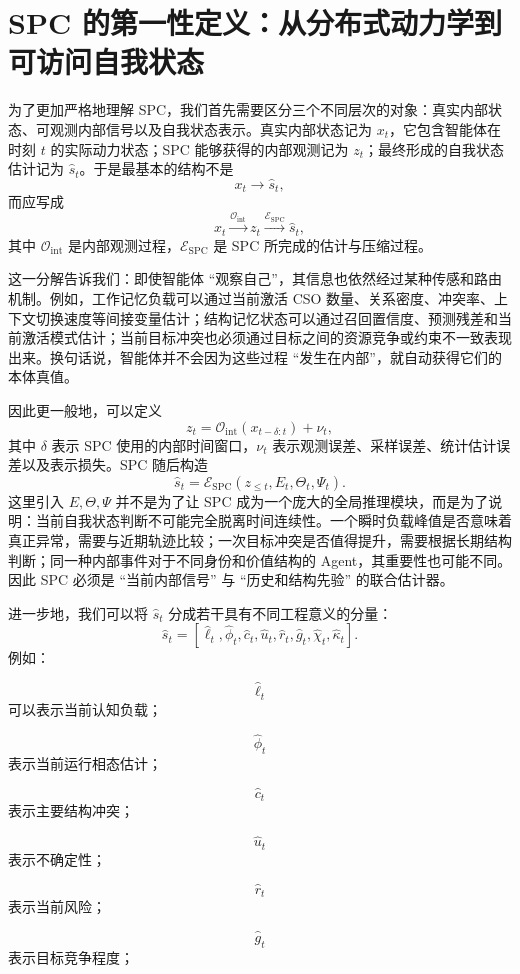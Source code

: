 \section{SPC 的第一性定义：从分布式动力学到可访问自我状态}

为了更加严格地理解 SPC，我们首先需要区分三个不同层次的对象：真实内部状态、可观测内部信号以及自我状态表示。真实内部状态记为 $x_t$，它包含智能体在时刻 $t$ 的实际动力状态；SPC 能够获得的内部观测记为 $z_t$；最终形成的自我状态估计记为 $\hat{s}_t$。于是最基本的结构不是
\[
x_t\rightarrow \hat{s}_t,
\]
而应写成
\[
x_t
\xrightarrow{\mathcal O_{\mathrm{int}}}
z_t
\xrightarrow{\mathcal E_{\mathrm{SPC}}}
\hat{s}_t ,
\]
其中 $\mathcal O_{\mathrm{int}}$ 是内部观测过程，$\mathcal E_{\mathrm{SPC}}$ 是 SPC 所完成的估计与压缩过程。

这一分解告诉我们：即使智能体 ``观察自己''，其信息也依然经过某种传感和路由机制。例如，工作记忆负载可以通过当前激活 CSO 数量、关系密度、冲突率、上下文切换速度等间接变量估计；结构记忆状态可以通过召回置信度、预测残差和当前激活模式估计；当前目标冲突也必须通过目标之间的资源竞争或约束不一致表现出来。换句话说，智能体并不会因为这些过程 ``发生在内部''，就自动获得它们的本体真值。

因此更一般地，可以定义
\[
z_t
=
\mathcal O_{\mathrm{int}}
\left(
x_{t-\delta:t}
\right)
+
\nu_t,
\]
其中 $\delta$ 表示 SPC 使用的内部时间窗口，$\nu_t$ 表示观测误差、采样误差、统计估计误差以及表示损失。SPC 随后构造
\[
\hat{s}_t
=
\mathcal E_{\mathrm{SPC}}
\left(
z_{\leq t},
E_t,
\Theta_t,
\Psi_t
\right).
\]
这里引入 $E,\Theta,\Psi$ 并不是为了让 SPC 成为一个庞大的全局推理模块，而是为了说明：当前自我状态判断不可能完全脱离时间连续性。一个瞬时负载峰值是否意味着真正异常，需要与近期轨迹比较；一次目标冲突是否值得提升，需要根据长期结构判断；同一种内部事件对于不同身份和价值结构的 Agent，其重要性也可能不同。因此 SPC 必须是 ``当前内部信号'' 与 ``历史和结构先验'' 的联合估计器。

进一步地，我们可以将 $\hat{s}_t$ 分成若干具有不同工程意义的分量：
\[
\hat{s}_t
=
\left[
\hat{\ell}_t,
\hat{\phi}_t,
\hat{c}_t,
\hat{u}_t,
\hat{r}_t,
\hat{g}_t,
\hat{\chi}_t,
\hat{\kappa}_t
\right].
\]
例如：

\[
\hat{\ell}_t
\]
可以表示当前认知负载；

\[
\hat{\phi}_t
\]
表示当前运行相态估计；

\[
\hat{c}_t
\]
表示主要结构冲突；

\[
\hat{u}_t
\]
表示不确定性；

\[
\hat{r}_t
\]
表示当前风险；

\[
\hat{g}_t
\]
表示目标竞争程度；

